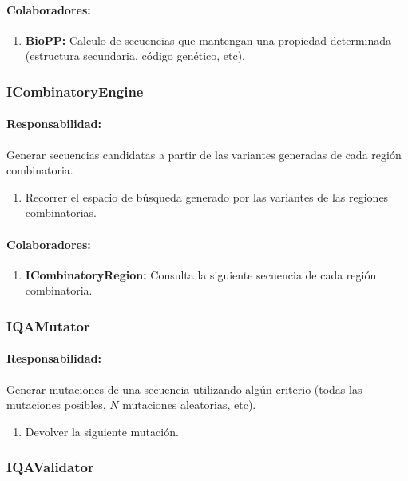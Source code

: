     \paragraph{Colaboradores:}
      \begin{enumerate}
       \item \textbf{BioPP:} Calculo de secuencias que mantengan una propiedad
determinada (estructura secundaria, c\'odigo gen\'etico, etc).
      \end{enumerate}

  \subsubsection{ICombinatoryEngine}
    \paragraph{Responsabilidad:} Generar secuencias candidatas a partir de las
variantes generadas de cada regi\'on combinatoria.   
      \begin{enumerate}       
       \item Recorrer el espacio de b\'usqueda generado por las variantes de
las regiones combinatorias.
      \end{enumerate}
    \paragraph{Colaboradores:}
      \begin{enumerate}
       \item \textbf{ICombinatoryRegion:} Consulta la siguiente secuencia de
cada regi\'on combinatoria.
      \end{enumerate}

  \subsubsection{IQAMutator}
    \paragraph{Responsabilidad:} Generar mutaciones de una secuencia
utilizando alg\'un criterio (todas las mutaciones posibles, $N$
mutaciones aleatorias, etc).
      \begin{enumerate}
       \item Devolver la siguiente mutaci\'on.
      \end{enumerate}    

  \subsubsection{IQAValidator}
